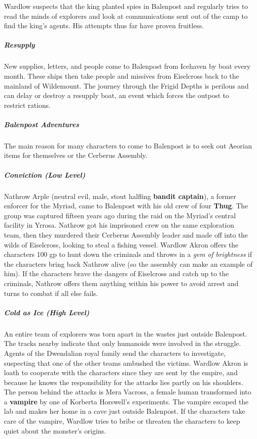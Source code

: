 \documentclass[10pt,a4paper,twoside,bg=print,twocolumn,openany,nodeprecatedcode]{dndbook}
\begin{document}
Wardlow suspects that the king planted spies in Balenpost and regularly tries to read the minds of explorers and look at communications sent out of the camp to find the king's agents. His attempts thus far have proven fruitless.

\subparagraph{Resupply}
New supplies, letters, and people come to Balenpost from Icehaven by boat every month. These ships then take people and missives from Eiselcross back to the mainland of Wildemount. The journey through the Frigid Depths is perilous and can delay or destroy a resupply boat, an event which forces the outpost to restrict rations.

\subparagraph{Balenpost Adventures}
The main reason for many characters to come to Balenpost is to seek out Aeorian items for themselves or the Cerberus Assembly.

\subparagraph{Conviction (Low Level)}
Nathrow Arple (neutral evil, male, stout halfling \textbf{bandit captain}), a former enforcer for the Myriad, came to Balenpost with his old crew of four \textbf{Thug}. The group was captured fifteen years ago during the raid on the Myriad's central facility in Yrrosa. Nathrow got his imprisoned crew on the same exploration team, then they murdered their Cerberus Assembly leader and made off into the wilds of Eiselcross, looking to steal a fishing vessel. Wardlow Akron offers the characters 100 gp to hunt down the criminals and throws in a \textit{gem of brightness} if the characters bring back Nathrow alive (so the assembly can make an example of him). If the characters brave the dangers of Eiselcross and catch up to the criminals, Nathrow offers them anything within his power to avoid arrest and turns to combat if all else fails.

\subparagraph{Cold as Ice (High Level)}
An entire team of explorers was torn apart in the wastes just outside Balenpost. The tracks nearby indicate that only humanoids were involved in the struggle. Agents of the Dwendalian royal family send the characters to investigate, suspecting that one of the other teams ambushed the victims. Wardlow Akron is loath to cooperate with the characters since they are sent by the empire, and because he knows the responsibility for the attacks lies partly on his shoulders. The person behind the attacks is Mera Vacross, a female human transformed into a \textbf{vampire} by one of Korberta Horswell's experiments. The vampire escaped the lab and makes her home in a cave just outside Balenpost. If the characters take care of the vampire, Wardlow tries to bribe or threaten the characters to keep quiet about the monster's origins.
\end{document}
